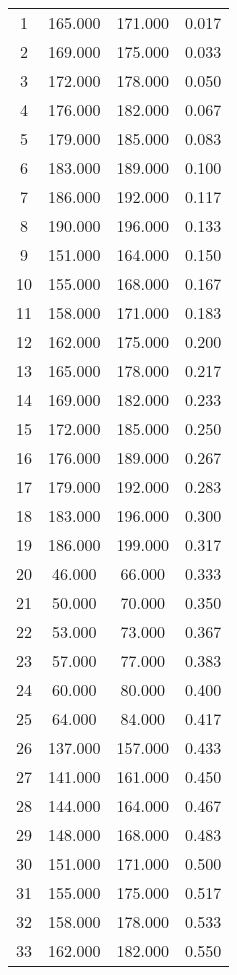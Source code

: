 % 
\begin{tabular}{cccc}
  \hline
  \hline
1 & 165.000 & 171.000 & 0.017 \\ 
  2 & 169.000 & 175.000 & 0.033 \\ 
  3 & 172.000 & 178.000 & 0.050 \\ 
  4 & 176.000 & 182.000 & 0.067 \\ 
  5 & 179.000 & 185.000 & 0.083 \\ 
  6 & 183.000 & 189.000 & 0.100 \\ 
  7 & 186.000 & 192.000 & 0.117 \\ 
  8 & 190.000 & 196.000 & 0.133 \\ 
  9 & 151.000 & 164.000 & 0.150 \\ 
  10 & 155.000 & 168.000 & 0.167 \\ 
  11 & 158.000 & 171.000 & 0.183 \\ 
  12 & 162.000 & 175.000 & 0.200 \\ 
  13 & 165.000 & 178.000 & 0.217 \\ 
  14 & 169.000 & 182.000 & 0.233 \\ 
  15 & 172.000 & 185.000 & 0.250 \\ 
  16 & 176.000 & 189.000 & 0.267 \\ 
  17 & 179.000 & 192.000 & 0.283 \\ 
  18 & 183.000 & 196.000 & 0.300 \\ 
  19 & 186.000 & 199.000 & 0.317 \\ 
  20 & 46.000 & 66.000 & 0.333 \\ 
  21 & 50.000 & 70.000 & 0.350 \\ 
  22 & 53.000 & 73.000 & 0.367 \\ 
  23 & 57.000 & 77.000 & 0.383 \\ 
  24 & 60.000 & 80.000 & 0.400 \\ 
  25 & 64.000 & 84.000 & 0.417 \\ 
  26 & 137.000 & 157.000 & 0.433 \\ 
  27 & 141.000 & 161.000 & 0.450 \\ 
  28 & 144.000 & 164.000 & 0.467 \\ 
  29 & 148.000 & 168.000 & 0.483 \\ 
  30 & 151.000 & 171.000 & 0.500 \\ 
  31 & 155.000 & 175.000 & 0.517 \\ 
  32 & 158.000 & 178.000 & 0.533 \\ 
  33 & 162.000 & 182.000 & 0.550 \\ 

\end{tabular}
